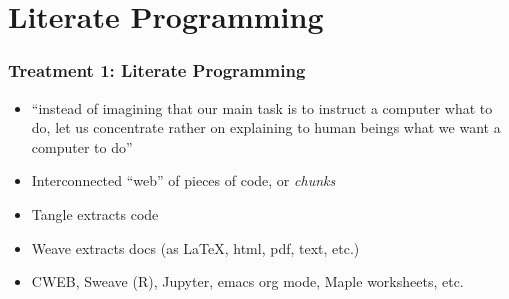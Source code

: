 \documentclass[usenames,dvipsnames]{beamer}
\begin{document}

\section[Literate]{Literate Programming}


\begin{frame}

  \frametitle{Treatment 1: Literate Programming}

  \begin{itemize}
  \item ``instead of imagining that our main task is to instruct a computer what
  to do, let us concentrate rather on explaining to human beings what we want a
  computer to do'' \citep[pg. 99]{Knuth1984}
  \item Interconnected ``web'' of pieces of code, or \emph{chunks}
  \item Tangle extracts code
  \item Weave extracts docs (as LaTeX, html, pdf, text, etc.)
  \item CWEB, Sweave (R), Jupyter, emacs org mode, Maple worksheets, etc.
  \end{itemize}

  
\end{frame}
  
\end{document}
